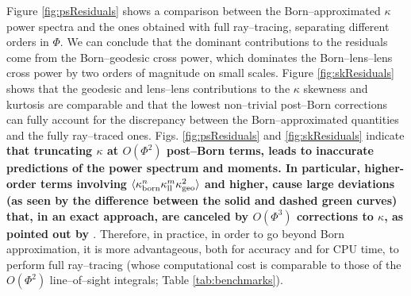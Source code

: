 \documentclass[reprint,aps,prd,superscriptaddress,showkeys,showpacs]{revtex4-1}
\begin{document}
Figure \ref{fig:psResiduals} shows a comparison between the Born--approximated $\kappa$ power spectra and the ones obtained with full ray--tracing, separating different orders in $\Phi$. We can conclude that the dominant contributions to the residuals come from the Born--geodesic cross power, which dominates the Born--lens--lens cross power by two orders of magnitude on small scales. Figure \ref{fig:skResiduals} shows that the geodesic and lens--lens contributions to the $\kappa$ skewness and kurtosis are comparable and that the lowest non--trivial post--Born corrections can fully account for the discrepancy between the Born--approximated quantities and the fully ray--traced ones. Figs. \ref{fig:psResiduals} and \ref{fig:skResiduals} indicate \textbf{\color{red} that truncating $\kappa$ at $O(\Phi^2)$ post--Born terms, leads to inaccurate predictions of the power spectrum and moments. In particular, higher-order terms involving $\langle \kappa_{\rm born}^n \kappa_{\rm ll}^m \kappa_{\rm geo}^2\rangle$ and higher, cause large deviations (as seen by the difference between the solid and dashed green curves) that, in an exact approach, are canceled by $O(\Phi^3)$ corrections to $\kappa$, as pointed out by \citep{HirataKrause}}. Therefore, in practice, in order to go beyond Born approximation, it is more advantageous, both for accuracy and for CPU time, to perform full ray--tracing (whose computational cost is comparable to those of the $O(\Phi^2)$ line--of--sight integrals; Table \ref{tab:benchmarks}).
\end{document}
